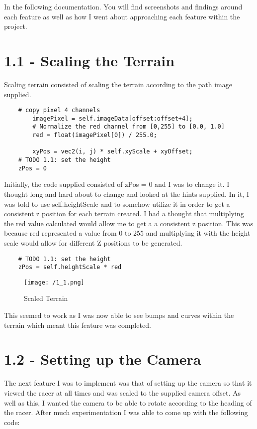 \documentclass[11pt, oneside, a4paper]{article}
\begin{document}
In the following documentation. You will find screenshots and findings around each feature as well as how I went about approaching each feature within the project.

\section*{1.1 - Scaling the Terrain}
Scaling terrain consisted of scaling the terrain according to the path image supplied.
\begin{lstlisting}    
	# copy pixel 4 channels
        imagePixel = self.imageData[offset:offset+4];
        # Normalize the red channel from [0,255] to [0.0, 1.0]
        red = float(imagePixel[0]) / 255.0;

        xyPos = vec2(i, j) * self.xyScale + xyOffset;
	# TODO 1.1: set the height
	zPos = 0
\end{lstlisting}

Initially, the code supplied consisted of zPos = 0 and I was to change it. I thought long and hard about to change and looked at the hints supplied. In it, I was told to use self.heightScale and to somehow utilize it in order to get a consistent z position for each terrain created. I had a thought that multiplying the red value calculated would allow me to get a a consistent z position. This was because red represented a value from 0 to 255 and multiplying it with the height scale would allow for different Z positions to be generated.

\newpage
\begin{lstlisting}    
	# TODO 1.1: set the height
	zPos = self.heightScale * red
\end{lstlisting}

\begin{figure}[!ht]
	\centerline{\texttt{[image: /1\_1.png]}}
	\caption{Scaled Terrain}
	\label{fig:figure1}
\end{figure}

This seemed to work as I was now able to see bumps and curves within the terrain which meant this feature was completed.

\section*{1.2 - Setting up the Camera}
The next feature I was to implement was that of setting up the camera so that it viewed the racer at all times and was scaled to the supplied camera offset. As well as this, I wanted the camera to be able to rotate according to the heading of the racer. After much experimentation I was able to come up with the following code:
\end{document}
